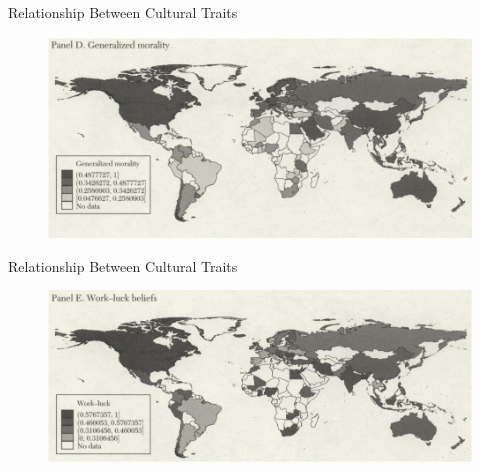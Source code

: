 \documentclass{beamer}
\begin{document}
                   \begin{frame}{Relationship Between Cultural Traits}
    
          \begin{figure}
        \centering
        \includegraphics[scale=0.6]{Map4.PNG}

    \end{figure} 

    
    \end{frame}

                   \begin{frame}{Relationship Between Cultural Traits}
    
          \begin{figure}
        \centering
        \includegraphics[scale=0.6]{Map5.PNG}

    \end{figure} 

    
    \end{frame}
\end{document}
